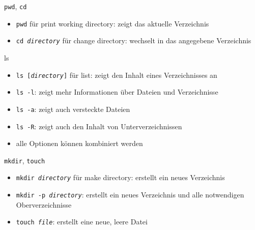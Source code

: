     \begin{frame}{\texttt{pwd}, \texttt{cd}}
      \begin{itemize}
        \item \texttt{pwd} für print working directory: zeigt das aktuelle Verzeichnis
        \item \texttt{cd \textit{directory}} für change directory: wechselt in das angegebene Verzeichnis
      \end{itemize}
    \end{frame}

    \begin{frame}{ls}
      \begin{itemize}
        \item \texttt{ls [\textit{directory}]} für list: zeigt den Inhalt eines Verzeichnisses an
        \item \texttt{ls -l}: zeigt mehr Informationen über Dateien und Verzeichnisse
        \item \texttt{ls -a}: zeigt auch versteckte Dateien
        \item \texttt{ls -R}: zeigt auch den Inhalt von Unterverzeichnissen
        \item alle Optionen können kombiniert werden
      \end{itemize}
    \end{frame}

    \begin{frame}{\texttt{mkdir}, \texttt{touch}}
      \begin{itemize}
        \item \texttt{mkdir \textit{directory}} für make directory: erstellt ein neues Verzeichnis
        \item \texttt{mkdir -p \textit{directory}}: erstellt ein neues Verzeichnis und alle notwendigen Oberverzeichnisse
        \item \texttt{touch \textit{file}}: erstellt eine neue, leere Datei
      \end{itemize}
    \end{frame}

